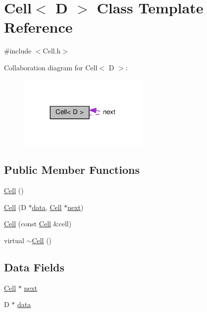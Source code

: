 \hypertarget{classCell}{}\section{Cell$<$ D $>$ Class Template Reference}
\label{classCell}


{\ttfamily \#include $<$Cell.\+h$>$}



Collaboration diagram for Cell$<$ D $>$\+:
\nopagebreak
\begin{figure}[H]
\begin{center}
\leavevmode
\includegraphics[width=179pt]{classCell__coll__graph}
\end{center}
\end{figure}
\subsection*{Public Member Functions}
\begin{DoxyCompactItemize}
\item 
\hyperlink{classCell_a742a2adf7fa420fa9cbe386a87b5c79b}{Cell} ()
\item 
\hyperlink{classCell_a6724cd6a883d7c16f2f529ecfd0dbf68}{Cell} (D $\ast$\hyperlink{classCell_ab8cc4d3059ef84a652eabc05b6c28f49}{data}, \hyperlink{classCell}{Cell} $\ast$\hyperlink{classCell_a7e0e6c090f8aca70862c2dbc3257e3b9}{next})
\item 
\hyperlink{classCell_a1882f51b9de9f6f52c5fb0530128bc92}{Cell} (const \hyperlink{classCell}{Cell} \&cell)
\item 
virtual \hyperlink{classCell_a8a6091a249d6ff583049c35c85f4d778}{$\sim$\+Cell} ()
\end{DoxyCompactItemize}
\subsection*{Data Fields}
\begin{DoxyCompactItemize}
\item 
\hyperlink{classCell}{Cell} $\ast$ \hyperlink{classCell_a7e0e6c090f8aca70862c2dbc3257e3b9}{next}
\item 
D $\ast$ \hyperlink{classCell_ab8cc4d3059ef84a652eabc05b6c28f49}{data}
\end{DoxyCompactItemize}



